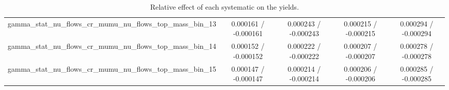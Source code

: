 \documentclass[10pt]{article}
\begin{document}
\begin{table}[htbp]
\begin{center}
\begin{tabular}{|c|c|c|c|c|}
  gamma_stat_nu_flows_cr_mumu_nu_flows_top_mass_bin_13 & 0.000161 / -0.000161 & 0.000243 / -0.000243 & 0.000215 / -0.000215 & 0.000294 / -0.000294 \\ 
  gamma_stat_nu_flows_cr_mumu_nu_flows_top_mass_bin_14 & 0.000152 / -0.000152 & 0.000222 / -0.000222 & 0.000207 / -0.000207 & 0.000278 / -0.000278 \\ 
  gamma_stat_nu_flows_cr_mumu_nu_flows_top_mass_bin_15 & 0.000147 / -0.000147 & 0.000214 / -0.000214 & 0.000206 / -0.000206 & 0.000285 / -0.000285 \\ 
\hline 
\end{tabular} 
\caption{Relative effect of each systematic on the yields.} 
\end{center} 
\end{table} 
\end{document}
